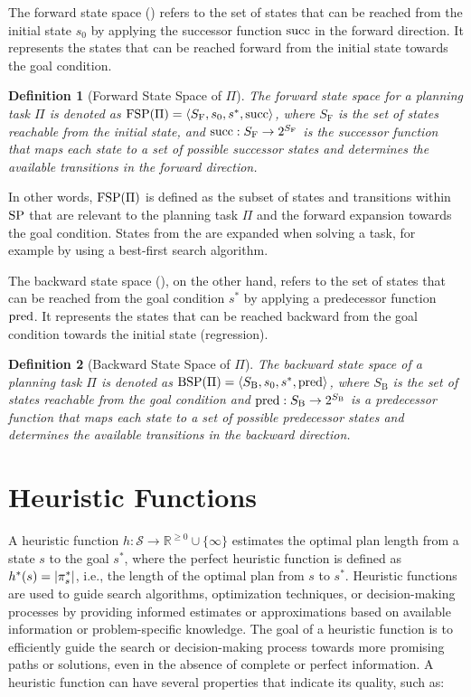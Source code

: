\documentclass[ppgc,diss,english]{iiufrgs}
\newtheorem{definition}{Definition}
\begin{document}
The forward state space (\fsp) refers to the set of states that can be reached from the initial state $s_0$ by applying the successor function $\operatorname{succ}$ in the forward direction. It represents the states that can be reached forward from the initial state towards the goal condition.

\begin{definition}[Forward State Space of $\Pi$]
The forward state space for a planning task $\Pi$ is denoted as ${\text{FSP}}(\Pi) = \langle S_{\text{F}}, s_0, s^{*}, \operatorname{succ} \rangle$, where $S_{\text{F}}$ is the set of states reachable from the initial state, and $\operatorname{succ} : S_{\text{F}} \to 2^{S_{\text{F}}}$ is the successor function that maps each state to a set of possible successor states and determines the available transitions in the forward direction.
\end{definition}

In other words, ${\text{FSP}}(\Pi)$ is defined as the subset of states and transitions within ${\text{SP}}$ that are relevant to the planning task $\Pi$ and the forward expansion towards the goal condition. States from the \fsp are expanded when solving a task, for example by using a best-first search algorithm.

The backward state space (\bsp), on the other hand, refers to the set of states that can be reached from the goal condition $s^{*}$ by applying a predecessor function $\operatorname{pred}$. It represents the states that can be reached backward from the goal condition towards the initial state (regression).

\begin{definition}[Backward State Space of $\Pi$]
The backward state space of a planning task $\Pi$ is denoted as ${\text{BSP}}(\Pi) = \langle S_{\text{B}}, s_{0}, s^{*}, \operatorname{pred} \rangle$, where $S_{\text{B}}$ is the set of states reachable from the goal condition and $\operatorname{pred} : S_{\text{B}} \to 2^{S_{\text{B}}}$ is a predecessor function that maps each state to a set of possible predecessor states and determines the available transitions in the backward direction.
\end{definition}


\section{Heuristic Functions}
\label{sec:background-heuristics}
A heuristic function $h:\mathcal{S}\rightarrow \mathbb{R}^{\geq 0}\cup\{\infty\}$ estimates the optimal plan length from a state $s$ to the goal $s^*$, where the perfect heuristic function is defined as $h^{*}(s) = |\pi_{s}^{*}|$, i.e., the length of the optimal plan from $s$ to $s^{*}$. Heuristic functions are used to guide search algorithms, optimization techniques, or decision-making processes by providing informed estimates or approximations based on available information or problem-specific knowledge. The goal of a heuristic function is to efficiently guide the search or decision-making process towards more promising paths or solutions, even in the absence of complete or perfect information. A heuristic function can have several properties that indicate its quality, such as:
\end{document}

